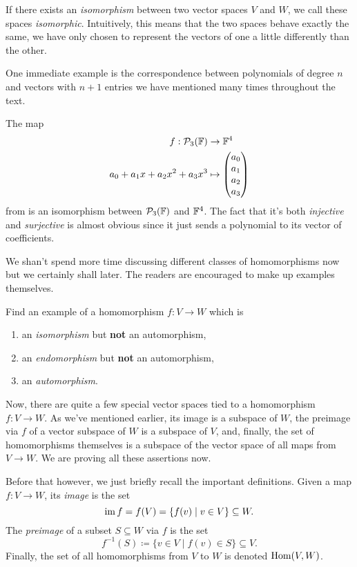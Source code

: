 If there exists an \emph{isomorphism} between two vector spaces $V$ and $W$, we
call these spaces \emph{isomorphic}. Intuitively, this means that the two spaces
behave exactly the same, we have only chosen to represent the vectors of one a
little differently than the other.

One immediate example is the correspondence between polynomials of degree $n$
and vectors with $n + 1$ entries we have mentioned many times throughout the
text.

The map
\begin{align*}
 f: \mathcal{P}_3(\mathbb{F}) &\to \mathbb{F}^{4}\\
 a_0 + a_1x + a_2x^2 + a_3x^3 & \mapsto 
 \begin{pmatrix}
  a_0\\
  a_1\\
  a_2\\
  a_3
 \end{pmatrix}
\end{align*}
from  is an isomorphism between $\mathcal{P}_3(\mathbb{F})$
and $\mathbb{F}^{4}$. The fact that it's both \emph{injective} and \emph{surjective} is
almost obvious since it just sends a polynomial to its vector of coefficients.

We shan't spend more time discussing different classes of homomorphisms now but
we certainly shall later. The readers are encouraged to make up examples
themselves.

\begin{exercise}{}{}
 Find an example of a homomorphism $f:V \to W$ which is
 \begin{enumerate}[label=(\alph*)]
  \item an \emph{isomorphism} but \textbf{not} an automorphism,
  \item an \emph{endomorphism} but \textbf{not} an automorphism,
  \item an \emph{automorphism}.
 \end{enumerate}
\end{exercise}

Now, there are quite a few special vector spaces tied to a homomorphism $f:V \to
W$. As we've mentioned earlier, its image is a subspace of $W$, the preimage via
$f$ of a vector subspace of $W$ is a subspace of $V$, and, finally, the set of
homomorphisms themselves is a subspace of the vector space of all maps from $V
\to W$. We are proving all these assertions now.

Before that however, we just briefly recall the important definitions. Given a
map $f:V \to W$, its \emph{image} is the set
\[
 \operatorname{im} f = f(V) = \{f(v) \mid v \in V\} \subseteq W.
\]
The \emph{preimage} of a subset $S \subseteq W$ via $f$ is the set
\[
 f^{-1}(S) \coloneqq \{v \in V \mid f(v) \in S\} \subseteq V.
\]
Finally, the set of all homomorphisms from $V$ to $W$ is denoted $\operatorname{Hom}(V,W)$.

